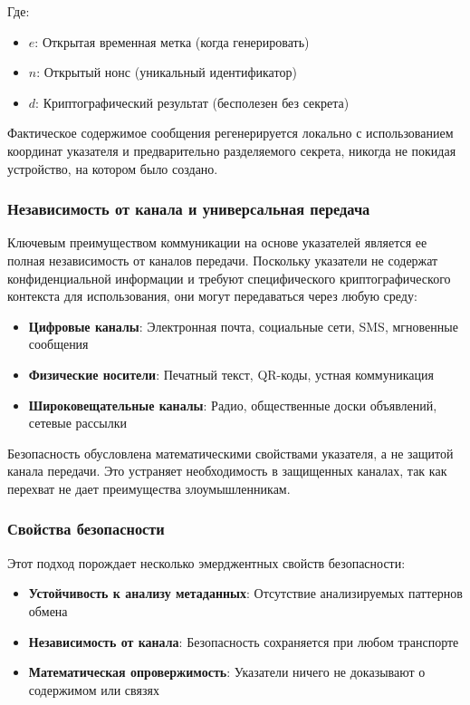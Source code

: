 \documentclass[11pt,a4paper]{article}
\begin{document}
Где:
\begin{itemize}
    \item $e$: Открытая временная метка (когда генерировать)
    \item $n$: Открытый нонс (уникальный идентификатор)
    \item $d$: Криптографический результат (бесполезен без секрета)
\end{itemize}

Фактическое содержимое сообщения регенерируется локально с использованием координат указателя и предварительно разделяемого секрета, никогда не покидая устройство, на котором было создано.

\subsubsection{Независимость от канала и универсальная передача}

Ключевым преимуществом коммуникации на основе указателей является ее полная независимость от каналов передачи. Поскольку указатели не содержат конфиденциальной информации и требуют специфического криптографического контекста для использования, они могут передаваться через любую среду:

\begin{itemize}
    \item \textbf{Цифровые каналы}: Электронная почта, социальные сети, SMS, мгновенные сообщения
    \item \textbf{Физические носители}: Печатный текст, QR-коды, устная коммуникация
    \item \textbf{Широковещательные каналы}: Радио, общественные доски объявлений, сетевые рассылки
\end{itemize}

Безопасность обусловлена математическими свойствами указателя, а не защитой канала передачи. Это устраняет необходимость в защищенных каналах, так как перехват не дает преимущества злоумышленникам.

\subsubsection{Свойства безопасности}

Этот подход порождает несколько эмерджентных свойств безопасности:

\begin{itemize}
    \item \textbf{Устойчивость к анализу метаданных}: Отсутствие анализируемых паттернов обмена
    \item \textbf{Независимость от канала}: Безопасность сохраняется при любом транспорте
    \item \textbf{Математическая опровержимость}: Указатели ничего не доказывают о содержимом или связях
\end{itemize}
\end{document}
